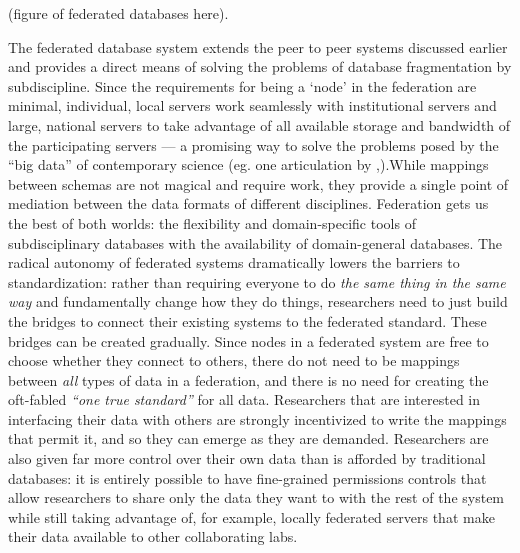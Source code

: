 \documentclass{article}
\begin{document}
(figure of federated databases here).

The federated database system extends the peer to peer systems discussed
earlier and provides a direct means of solving the problems of database
fragmentation by subdiscipline. Since the requirements for being a
`node' in the federation are minimal, individual, local servers work
seamlessly with institutional servers and large, national servers to
take advantage of all available storage and bandwidth of the
participating servers --- a promising way to solve the problems posed by
the ``big data'' of contemporary science (eg. one articulation by \cite{charlesCommunityDrivenBigOpen2020},).While mappings between
schemas are not magical and require work, they provide a single point of
mediation between the data formats of different disciplines. Federation
gets us the best of both worlds: the flexibility and domain-specific
tools of subdisciplinary databases with the availability of
domain-general databases. The radical autonomy of federated systems
dramatically lowers the barriers to standardization: rather than
requiring everyone to do \emph{the same thing in the same way} and
fundamentally change how they do things, researchers need to just build
the bridges to connect their existing systems to the federated standard.
These bridges can be created gradually. Since nodes in a federated
system are free to choose whether they connect to others, there do not
need to be mappings between \emph{all} types of data in a federation,
and there is no need for creating the oft-fabled \emph{``one true
standard''} for all data. Researchers that are interested in interfacing
their data with others are strongly incentivized to write the mappings
that permit it, and so they can emerge as they are demanded. Researchers
are also given far more control over their own data than is afforded by
traditional databases: it is entirely possible to have fine-grained
permissions controls that allow researchers to share only the data they
want to with the rest of the system while still taking advantage of, for
example, locally federated servers that make their data available to
other collaborating labs.
\end{document}
